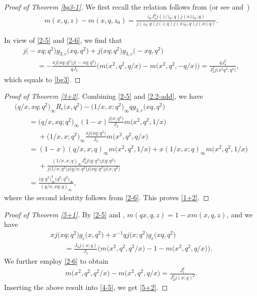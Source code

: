 \documentclass[pdftex]{sigma}
\numberwithin{equation}{section}
\begin{document}
\begin{proof} [Proof of Theorem \ref{bg3-1}]
We first recall the relation follows from \cite[equation~(3.7)]{HM} (or see \cite[Chapter~8]{BFOR} and~\cite{Z})
\begin{align}\label{2-6}
m(x,q,z)-m(x,q,z_0)=\frac{z_0J_1^3j(z/z_0;q)j(xzz_0;q)}
{j(z_0;q)j(z;q)j(xz_0;q)j(xz;q)}.
\end{align}

In view of \eqref{2-5} and \eqref{2-6}, we find that
\begin{gather*}
j\bigl(-xq;q^2\bigr)g_{3,c}\bigl(xq,q^2\bigr)+j\bigl(xq;q^2\bigr)g_{3,c}\bigl(-xq,q^2\bigr)\\
\qquad=-\frac{xj\bigl(xq;q^2\bigr)j\bigl(-xq;q^2\bigr)}{qJ_2}\bigl(m\bigl(x^2,q^2,q/x\bigr)-m\bigl(x^2,q^2,-q/x\bigr)\bigr)=\frac{4J_4^5}{J_2^2j\bigl(x^2q^2;q^4\bigr)},
\end{gather*}
which equals to \eqref{bg3}.
\end{proof}
\begin{proof}[Proof of Theorem \ref{3+2}]
Combining \eqref{2-5} and \eqref{2.2-add},
we have
\begin{gather*}
\bigl(q/x,xq;q^2\bigr)_{\infty}R_c\bigl(x,q^2\bigr)
-\bigl(1/x,x;q^2\bigr)_{\infty}qg_{3,c}\bigl(xq,q^2\bigr)\\
\qquad=\bigl(q/x,xq;q^2\bigr)_{\infty}(1-x)\frac{j\bigl(x;q^2\bigr)}{J_2}m\bigl(x^2,q^2,1/x\bigr)\\
\phantom{\qquad=}{}+\bigl(1/x,x;q^2\bigr)_{\infty}\frac{x j\bigl(xq;q^2\bigr)}{J_2}m\bigl(x^2,q^2,q/x\bigr)\\
\qquad=(1-x)(q/x,x;q)_{\infty}m\bigl(x^2,q^2,1/x\bigr)+x(1/x,x;q)_{\infty}m\bigl(x^2,q^2,1/x\bigr)\\
\phantom{\qquad=}{}+\frac{(1/x,x;q)_{\infty}J_2^3j\bigl(q;q^2\bigr)j\bigl(q;q^2\bigr)}
{j\bigl(1/x;q^2\bigr)j\bigl(q/x;q^2\bigr)j\bigl(xq;q^2\bigr)j\bigl(x;q^2\bigr)}\\
\qquad=\frac{\bigl(q;q^2\bigr)_{\infty}^4\bigl(q^2;q^2\bigr)_{\infty}}{(q/x,xq;q)_{\infty}},
\end{gather*}
where the second identity follows from \eqref{2-6}. This proves \eqref{1+2}.
\end{proof}
\begin{proof}[Proof of Theorem \ref{5+1}]
By \eqref{2-5} and \cite[(3.2c)]{HM},
$
m(qx,q,z)=1-xm(x,q,z)$,
and we have
\begin{gather}
xj\bigl(xq;q^2\bigr)g_c\bigl(x,q^2\bigr)+x^{-1}qj\bigl(x;q^2\bigr)g_c\bigl(xq,q^2\bigr)\nonumber\\
\qquad=\frac{J_2j(x;q)}{J_1}\bigl(m\bigl(x^2,q^2,q^2/x\bigr)-1-m\bigl(x^2,q^2,q/x\bigr)\bigr).\label{4-5}
\end{gather}
We further employ \eqref{2-6} to obtain
\begin{align*}
m\bigl(x^2,q^2,q^2/x\bigr)-m\bigl(x^2,q^2,q/x\bigr)=\frac{J_1^6}{J_2^3j(x;q)^2}.
\end{align*}
Inserting the above result into \eqref{4-5}, we get \eqref{5+2}.
\end{proof}
\end{document}
